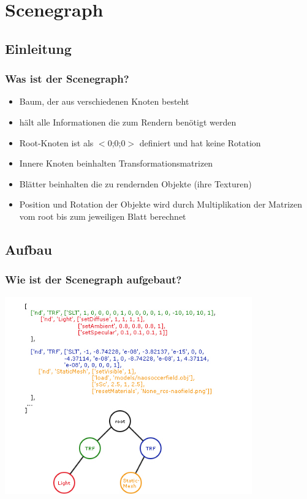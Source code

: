 
 
\section{Scenegraph}

\begin{frame}
\tableofcontents[currentsection]
\end{frame}
 
 
\subsection{Einleitung}
\frame %
{
  \frametitle{Was ist der Scenegraph?} %
	  \begin{itemize}
	  \item Baum, der aus verschiedenen Knoten besteht
	  \item hält alle Informationen die zum Rendern benötigt werden
	  \item Root-Knoten ist als $<$0;0;0$>$ definiert und hat keine Rotation
	  \item Innere Knoten beinhalten Transformationsmatrizen
	  \item Blätter beinhalten die zu rendernden Objekte (ihre Texturen)
	  \item Position und Rotation der Objekte wird durch Multiplikation der Matrizen vom root bis zum jeweiligen Blatt berechnet
	\end{itemize}
}

\subsection{Aufbau}
\frame
{
  \frametitle{Wie ist der Scenegraph aufgebaut?} %
	\includegraphics[width=0.8\textwidth]{Scene}
}

